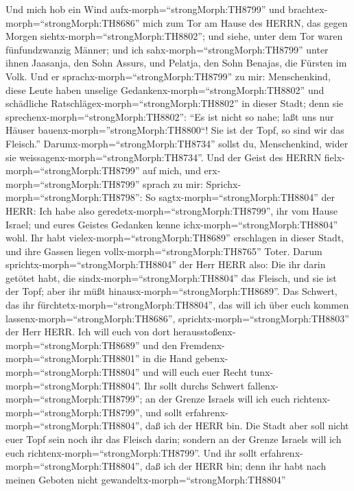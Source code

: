  Und mich hob ein Wind aufx-morph=``strongMorph:TH8799'' und
brachtex-morph=``strongMorph:TH8686'' mich zum Tor am Hause des HERRN,
das gegen Morgen siehtx-morph=``strongMorph:TH8802''; und siehe, unter
dem Tor waren fünfundzwanzig Männer; und ich
sahx-morph=``strongMorph:TH8799'' unter ihnen Jaasanja, den Sohn Assurs,
und Pelatja, den Sohn Benajas, die Fürsten im Volk.  Und er
sprachx-morph=``strongMorph:TH8799'' zu mir: Menschenkind, diese Leute
haben unselige Gedankenx-morph=``strongMorph:TH8802'' und schädliche
Ratschlägex-morph=``strongMorph:TH8802'' in dieser Stadt; 
denn sie sprechenx-morph=``strongMorph:TH8802'': ``Es ist nicht so nahe;
laßt uns nur Häuser bauenx-morph=''strongMorph:TH8800``! Sie ist der
Topf, so sind wir das Fleisch.'' 
Darumx-morph=``strongMorph:TH8734'' sollst du, Menschenkind, wider sie
weissagenx-morph=``strongMorph:TH8734''.  Und der Geist des
HERRN fielx-morph=``strongMorph:TH8799'' auf mich, und
erx-morph=``strongMorph:TH8799'' sprach zu mir:
Sprichx-morph=``strongMorph:TH8798'': So
sagtx-morph=``strongMorph:TH8804'' der HERR: Ich habe also
geredetx-morph=``strongMorph:TH8799'', ihr vom Hause Israel; und eures
Geistes Gedanken kenne ichx-morph=``strongMorph:TH8804'' wohl.
 Ihr habt vielex-morph=``strongMorph:TH8689'' erschlagen in
dieser Stadt, und ihre Gassen liegen vollx-morph=``strongMorph:TH8765''
Toter.  Darum sprichtx-morph=``strongMorph:TH8804'' der Herr
HERR also: Die ihr darin getötet habt, die
sindx-morph=``strongMorph:TH8804'' das Fleisch, und sie ist der Topf;
aber ihr müßt hinausx-morph=``strongMorph:TH8689''.  Das
Schwert, das ihr fürchtetx-morph=``strongMorph:TH8804'', das will ich
über euch kommen lassenx-morph=``strongMorph:TH8686'',
sprichtx-morph=``strongMorph:TH8803'' der Herr HERR.  Ich
will euch von dort herausstoßenx-morph=``strongMorph:TH8689'' und den
Fremdenx-morph=``strongMorph:TH8801'' in die Hand
gebenx-morph=``strongMorph:TH8804'' und will euch euer Recht
tunx-morph=``strongMorph:TH8804''.  Ihr sollt durchs
Schwert fallenx-morph=``strongMorph:TH8799''; an der Grenze Israels will
ich euch richtenx-morph=``strongMorph:TH8799'', und sollt
erfahrenx-morph=``strongMorph:TH8804'', daß ich der HERR bin.
 Die Stadt aber soll nicht euer Topf sein noch ihr das
Fleisch darin; sondern an der Grenze Israels will ich euch
richtenx-morph=``strongMorph:TH8799''.  Und ihr sollt
erfahrenx-morph=``strongMorph:TH8804'', daß ich der HERR bin; denn ihr
habt nach meinen Geboten nicht gewandeltx-morph=``strongMorph:TH8804''
